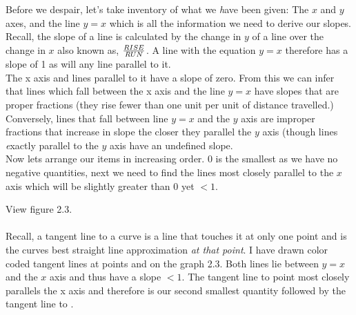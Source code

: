 \documentclass{article}
\begin{document}
\begin{enumerate}
Before we despair, let's take inventory of what we \emph have been given: The $x$ and $ y$ axes, and the line {\color{red}$y = x$} which is all the information we need to derive our slopes. \\

Recall, the slope of a line is calculated by the change in $y$ of a line over the change in $x$ also known as, $\frac{\text \bfseries RISE}{\text \bfseries RUN}$.
A line with the equation $y=x$ therefore has a slope of 1 as will any line parallel to it.\\ The x axis and lines parallel to it have a slope of zero. From this we can infer that lines which fall between the x axis and the line $y=x$ have slopes that are proper fractions (they rise fewer than one unit per unit of distance travelled.) Conversely, lines that fall between line $y=x$ and the $y$ axis are improper fractions that increase in slope the closer they parallel the $y$ axis (though lines {\emph exactly} parallel to the $y$ axis have an undefined slope. \\

Now lets arrange our items in increasing order. 0 is the smallest as we have no negative quantities, next we need to find the lines most closely parallel to the $x$ axis which will be slightly greater than 0 yet $< 1$.

\pagebreak

View figure 2.3.\\
 \\ 

Recall, a tangent line to a curve is a line that touches it at only one point and is the curves best straight line approximation \emph{at that point}. I have drawn color coded tangent lines at points { \color{green}{B}} and {\color{blue}{C}} on the graph 2.3.  Both lines lie between {\color{red} $y=x$} and the $x$ axis and thus have a slope $< 1$. The tangent line to point {\color{blue}{C}} most closely parallels the x axis and therefore is our second smallest quantity followed by the tangent line to { \color{green}{B}}. \\


\end{enumerate}
\end{document}
